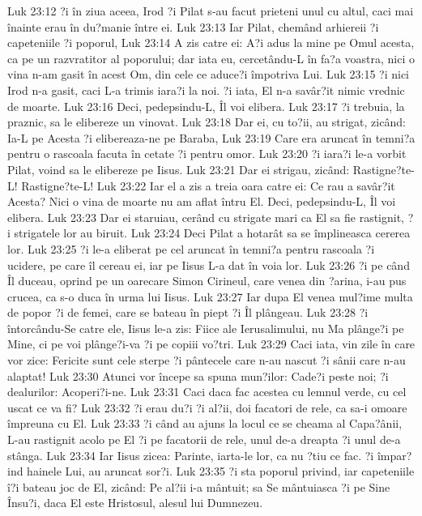 Luk 23:12  ?i în ziua aceea, Irod ?i Pilat s-au facut prieteni unul cu altul, caci mai înainte erau în du?manie între ei.
Luk 23:13  Iar Pilat, chemând arhiereii ?i capeteniile ?i poporul,
Luk 23:14  A zis catre ei: A?i adus la mine pe Omul acesta, ca pe un razvratitor al poporului; dar iata eu, cercetându-L în fa?a voastra, nici o vina n-am gasit în acest Om, din cele ce aduce?i împotriva Lui.
Luk 23:15  ?i nici Irod n-a gasit, caci L-a trimis iara?i la noi. ?i iata, El n-a savâr?it nimic vrednic de moarte.
Luk 23:16  Deci, pedepsindu-L, Îl voi elibera.
Luk 23:17  ?i trebuia, la praznic, sa le elibereze un vinovat.
Luk 23:18  Dar ei, cu to?ii, au strigat, zicând: Ia-L pe Acesta ?i elibereaza-ne pe Baraba,
Luk 23:19  Care era aruncat în temni?a pentru o rascoala facuta în cetate ?i pentru omor.
Luk 23:20  ?i iara?i le-a vorbit Pilat, voind sa le elibereze pe Iisus.
Luk 23:21  Dar ei strigau, zicând: Rastigne?te-L! Rastigne?te-L!
Luk 23:22  Iar el a zis a treia oara catre ei: Ce rau a savâr?it Acesta? Nici o vina de moarte nu am aflat întru El. Deci, pedepsindu-L, Îl voi elibera.
Luk 23:23  Dar ei staruiau, cerând cu strigate mari ca El sa fie rastignit, ?i strigatele lor au biruit.
Luk 23:24  Deci Pilat a hotarât sa se împlineasca cererea lor.
Luk 23:25  ?i le-a eliberat pe cel aruncat în temni?a pentru rascoala ?i ucidere, pe care îl cereau ei, iar pe Iisus L-a dat în voia lor.
Luk 23:26  ?i pe când Îl duceau, oprind pe un oarecare Simon Cirineul, care venea din ?arina, i-au pus crucea, ca s-o duca în urma lui Iisus.
Luk 23:27  Iar dupa El venea mul?ime multa de popor ?i de femei, care se bateau în piept ?i Îl plângeau.
Luk 23:28  ?i întorcându-Se catre ele, Iisus le-a zis: Fiice ale Ierusalimului, nu Ma plânge?i pe Mine, ci pe voi plânge?i-va ?i pe copiii vo?tri.
Luk 23:29  Caci iata, vin zile în care vor zice: Fericite sunt cele sterpe ?i pântecele care n-au nascut ?i sânii care n-au alaptat!
Luk 23:30  Atunci vor începe sa spuna mun?ilor: Cade?i peste noi; ?i dealurilor: Acoperi?i-ne.
Luk 23:31  Caci daca fac acestea cu lemnul verde, cu cel uscat ce va fi?
Luk 23:32  ?i erau du?i ?i al?ii, doi facatori de rele, ca sa-i omoare împreuna cu El.
Luk 23:33  ?i când au ajuns la locul ce se cheama al Capa?ânii, L-au rastignit acolo pe El ?i pe facatorii de rele, unul de-a dreapta ?i unul de-a stânga.
Luk 23:34  Iar Iisus zicea: Parinte, iarta-le lor, ca nu ?tiu ce fac. ?i împar?ind hainele Lui, au aruncat sor?i.
Luk 23:35  ?i sta poporul privind, iar capeteniile î?i bateau joc de El, zicând: Pe al?ii i-a mântuit; sa Se mântuiasca ?i pe Sine Însu?i, daca El este Hristosul, alesul lui Dumnezeu.
